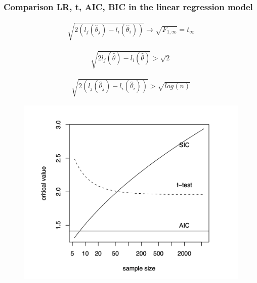 \documentclass[
  shownotes,
  xcolor={svgnames},
  hyperref={colorlinks,citecolor=DarkBlue,linkcolor=DarkRed,urlcolor=DarkBlue}
  ]{beamer}
\begin{document}
\begin{frame}[fragile]
\frametitle{Comparison LR, t, AIC, BIC in the linear regression model}


\begin{minipage}[t]{0.52\linewidth}
\scriptsize
\begin{align}
\sqrt{2(l_j(\hat \theta_j)-l_i(\hat \theta_i))} \rightarrow \sqrt{F_{1,\infty}}=t_\infty \nonumber
\end{align}

\begin{align}
\sqrt{2 l_j(\hat \theta) - l_i(\hat \theta)} > \sqrt{2} \nonumber
\end{align}

\begin{align}
 \sqrt{2(l_j(\hat \theta_j)-l_i(\hat \theta_i)) }> \sqrt{log(n)} \nonumber
 \end{align}
  \end{minipage}
    \hfill
    \begin{minipage}[t]{0.43\linewidth}%

\begin{figure}[H] \centering
            \captionsetup{justification=centering}
              \includegraphics[scale=0.3]{figures/Fig1}
 \end{figure}
   \end{minipage}

\end{frame}
\end{document}
